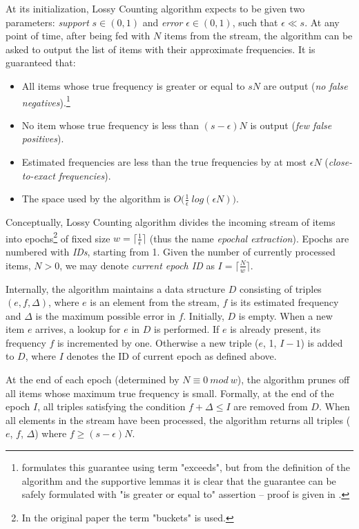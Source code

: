 At its initialization, Lossy Counting algorithm expects to be given two parameters:
\emph{support} $s \in (0,1)$ and \emph{error} $\epsilon \in (0,1)$, such
that $\epsilon \ll s$.
At any point of time, after being fed with $N$ items from the stream,
the algorithm can be asked to output the list of items with their approximate
frequencies. It is guaranteed that:
\begin{itemize}
 \item All items whose true frequency is greater or equal to $sN$ are output
  (\emph{no false negatives}).\footnote{\citet{manku:lossycounting} formulates this
    guarantee using term "exceeds", but from the definition of the algorithm and
    the supportive lemmas it is clear that the guarantee can be safely formulated with
    "is greater or equal to" assertion -- proof is given in .}
 \item No item whose true frequency is less than $(s - \epsilon)N$ is output
  (\emph{few false positives}).
 \item Estimated frequencies are less than the true frequencies by at most
  $\epsilon N$ (\emph{close-to-exact frequencies}).
 \item The space used by the algorithm is $O\big(\frac{1}{\epsilon}~log(\epsilon N)\big)$.
\end{itemize}

Conceptually, Lossy Counting algorithm divides the incoming stream of items
into epochs\footnote{In the original paper the term "buckets" is used.}
of fixed size $w = \lceil \frac{1}{\epsilon} \rceil$
(thus the name \emph{epochal extraction}).
Epochs are numbered with \emph{IDs}, starting from 1.
Given the number of currently processed items, $N > 0$, we may denote
\emph{current epoch ID} as $I = \lceil \frac{N}{w} \rceil$.

Internally, the algorithm maintains a data structure $D$ consisting of triples
$(e, f, \Delta)$, where $e$ is an element from the stream, $f$ is its estimated
frequency and $\Delta$ is the maximum possible error in $f$.
Initially, $D$ is empty.
When a new item $e$ arrives, a lookup for $e$ in $D$ is performed.
If $e$ is already present, its frequency $f$ is incremented by one.
Otherwise a new triple ($e$, 1, $I-1$) is added to $D$,
where $I$ denotes the ID of current epoch as defined above.

At the end of each epoch (determined by $N \equiv 0~mod~w$), the algorithm
prunes off all items whose maximum true frequency is small.
Formally, at the end of the epoch $I$, all triples satisfying the condition
$f + \Delta \leq I$ are removed from $D$.
When all elements in the stream have been processed, the algorithm returns all
triples ($e$, $f$, $\Delta$) where $f \geq (s-\epsilon)N$.

